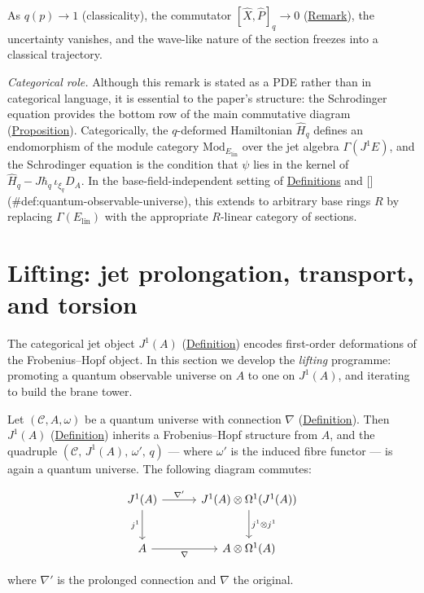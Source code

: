 \begin{remark}
As $q(p) \to 1$ (classicality), the commutator
$[\hat{X}, \hat{P}]_q \to 0$ (\hyperref[rem:heisenberg-commutator]{Remark}), the
uncertainty vanishes, and the wave-like nature of the section freezes into a
classical trajectory.

\emph{Categorical role.}
Although this remark is stated as a PDE rather than in categorical language,
it is essential to the paper's structure: the Schrodinger equation
provides the bottom row of the main commutative diagram
(\hyperref[prop:main-commutative-diagram]{Proposition}). Categorically, the
$q$-deformed Hamiltonian $\hat{H}_q$ defines an endomorphism of the
module category $\mathrm{Mod}_{E_{\mathrm{lin}}}$ over the jet algebra
$\Gamma(J^1 E)$, and the Schrodinger equation is the condition that
$\psi$ lies in the kernel of $\hat{H}_q - J\hbar_q\,\iota_{\xi_q}D_A$.
In the base-field-independent setting of
\hyperref[def:quantum-universe]{Definitions}
and [](#def:quantum-observable-universe), this extends to arbitrary base
rings $R$ by replacing $\Gamma(E_{\mathrm{lin}})$ with the appropriate
$R$-linear category of sections.
\end{remark}

\section{Lifting: jet prolongation, transport, and torsion}
\label{sec:lifting}

The categorical jet object $J^1(A)$ (\hyperref[def:categorical-jet]{Definition})
encodes first-order deformations of the Frobenius--Hopf object. In this
section we develop the \emph{lifting} programme: promoting a quantum
observable universe on $A$ to one on $J^1(A)$, and iterating to build
the brane tower.

\begin{proposition}
  \label{prop:categorical-jet-prolongation}
Let $(\mathcal{C}, A, \omega)$ be a quantum universe with
connection $\nabla$ (\hyperref[def:categorical-connection]{Definition}).
Then $J^1(A)$ (\hyperref[def:categorical-jet]{Definition}) inherits a
Frobenius--Hopf structure from $A$, and the quadruple
$(\mathcal{C},\, J^1(A),\, \omega',\, q)$ --- where $\omega'$ is
the induced fibre functor --- is again a quantum universe.
The following diagram commutes:

\begin{equation}\label{eq:jet-prolongation-cd}
\begin{tikzcd}[row sep=2.5em, column sep=3em]
  J^1(A) \ar[r, "\nabla'"] \ar[d, "j^1"']
  & J^1(A) \otimes \Omega^1(J^1(A)) \ar[d, "j^1 \otimes j^1"] \\
  A \ar[r, "\nabla"']
  & A \otimes \Omega^1(A)
\end{tikzcd}
\end{equation}

where $\nabla'$ is the prolonged connection and $\nabla$ the original.
\end{proposition}

